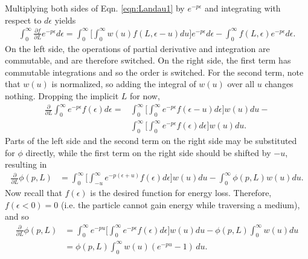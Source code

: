 Multiplying both sides of Eqn. \ref{eqn:Landau1} by $e^{-p\epsilon}$ and integrating with respect to $d\epsilon$ yields
\begin{align*}
\int_0 ^\infty \frac{\partial f}{\partial L} e^{-p\epsilon} d\epsilon = \int_0 ^\infty \Bigg [\int_0 ^\infty w(u) f(L,\epsilon-u) du \Bigg]e^{-p\epsilon} d\epsilon -  \int_0 ^\infty f(L,\epsilon) e^{-p\epsilon} d\epsilon.
\end{align*}
On the left side, the operations of partial derivative and integration are commutable, and are therefore switched. On the right side, the first term has commutable integrations and so the order is switched. For the second term, note that $w(u)$ is normalized, so adding the integral of $w(u)$ over all $u$ changes nothing. Dropping the implicit $L$ for now,
\begin{align*}
\frac{\partial}{\partial L}\int_0 ^\infty e^{-p\epsilon} f(\epsilon) d\epsilon = &\int_0 ^\infty \Bigg[\int_0 ^\infty e^{-p\epsilon} f(\epsilon-u)  d\epsilon \Bigg] w(u) du -\\
 & \int_0 ^\infty \Bigg[\int_0 ^\infty e^{-p\epsilon}f(\epsilon) d\epsilon \Bigg] w(u) du.
\end{align*}
Parts of the left side and the second term on the right side may be substituted for $\phi$ directly, while the first term on the right side should be shifted by $-u$, resulting in
\begin{align*}
\frac{\partial}{\partial L} \phi(p,L) &= \int_0 ^\infty \Bigg[\int_{-u} ^\infty e^{-p(\epsilon+u)} f(\epsilon)  d\epsilon \Bigg] w(u) du -\int_0 ^\infty \phi(p,L) w(u) du.
\end{align*}
Now recall that $f(\epsilon)$ is the desired function for energy loss. Therefore, $f(\epsilon<0)=0$ (i.e. the particle cannot gain energy while traversing a medium), and so
\begin{align}
\frac{\partial}{\partial L} \phi(p,L) &= \int_0 ^\infty e^{-pu}\Bigg[\int_{0} ^\infty e^{-p\epsilon} f(\epsilon)  d\epsilon \Bigg] w(u) du -\phi(p,L) \int_0 ^\infty w(u) du\nonumber\\
&=\phi(p,L)\int_0 ^\infty w(u)(e^{-pu}-1)\, du. \nonumber%
\end{align}

